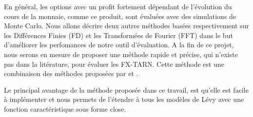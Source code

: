En général, les options avec un profit fortement dépendant de l'évolution du cours de la monnaie, comme ce produit, sont évaluées avec des simulations de Monte Carlo. Nous allons décrire deux autres méthodes basées respectivement sur les Différences Finies (FD) et les Transformées de Fourier (FFT) dans le but d'améliorer les perfomances de notre outil d'évaluation. A la fin de ce projet, nous serons en mesure de proposer une méthode rapide et précise, qui n'existe pas dans la litérature, pour évaluer les FX-TARN. Cette méthode est une combinaison des méthodes proposées par \citeauthor{LS15} \citeyearpar{LS15} \cite{LS15} et \citeauthor{Lor+08} \citeyearpar{Lor+08} \cite{Lor+08}. 

Le principal avantage de la méthode proposée dans ce travail, est qu'elle est facile à implémenter et nous permets de l'étendre à tous les modèles de Lévy avec une fonction caractéristique sous forme close.

